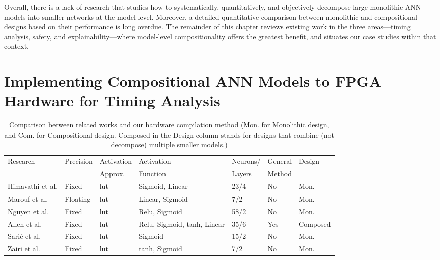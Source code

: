 Overall, there is a lack of research that studies how to systematically, quantitatively, and objectively decompose large monolithic ANN models into smaller networks at the model level. Moreover, a detailed quantitative comparison between monolithic and compositional designs based on their performance is long overdue. The remainder of this chapter reviews existing work in the three areas---timing analysis, safety, and explainability---where model-level compositionality offers the greatest benefit, and situates our case studies within that context.


\section{Implementing Compositional ANN Models to FPGA Hardware for Timing Analysis}
\label{sec:lit_fpga_implementation}



\begin{table}[htbp]
  \caption{Comparison between related works and our hardware compilation method (Mon. for Monolithic design, and Com. for Compositional design. Composed in the Design column stands for designs that combine (not decompose) multiple smaller models.)}
  \begin{tabularx}{6in}{|X|X|X|X|X|X|X|}
  \hline
 Research & Precision & Activation & Activation & Neurons/ & General & Design \\
   & & Approx. & Function & Layers & Method & \\
  \hline
 Himavathi et al.\cite{himavathi_feedforward_2007} & Fixed   & \gls{lut} & Sigmoid, Linear  &23/4 & No & Mon. \\
 Marouf et al. \cite{marouf_fpga_2012} & Floating  & \gls{lut}  & Linear, Sigmoid & 7/2 & No & Mon. \\
 Nguyen et al. \cite{nguyen_efficient_2018} & Fixed    & \gls{lut}  & Relu, Sigmoid & 58/2 & No & Mon.    \\
 Allen et al. \cite{allen_compositional_2019-1} & Fixed    & \gls{lut}  & Relu, Sigmoid, \gls{tanh}, Linear & 35/6 & Yes & Composed  \\
 Sarić et al. \cite{saric_fpga-based_2020-1} & Fixed  & \gls{lut}  & Sigmoid & 15/2& No    & Mon. \\
 Zairi et al. \cite{zairi_fpga-based_2020} & Fixed   & \gls{lut} & \gls{tanh}, Sigmoid & 7/2 & No & Mon. \\
  \hline
  \end{tabularx}
  \label{tab:fpga_comparison}
\end{table}


